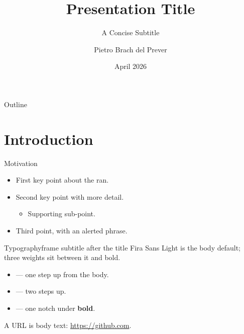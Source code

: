 \documentclass[aspectratio=169, 10pt]{beamer}
\title{Presentation Title}
\subtitle{A Concise Subtitle}
\author[P.\ Brach del Prever]{Pietro Brach del Prever}
\institute[NU / INSI]{Northeastern University \\ Institute for Intelligent Networked Systems}
\date{April 2026}
\begin{document}
{
\begin{frame}[plain]
	\titlepage
\end{frame}
}

\begin{frame}{Outline}
	\tableofcontents
\end{frame}

\section{Introduction}
\sectionframe

\begin{frame}{Motivation}
	\begin{itemize}\tightlist
		\item First key point about the \gls{ran}.
		\item Second key point with more detail.
		      \begin{itemize}
			      \item Supporting sub-point.
		      \end{itemize}
		\item Third point, \alert{with an alerted phrase}.
	\end{itemize}
\end{frame}

\begin{frame}{Typography}{frame subtitle after the title}
	Fira Sans Light is the body default; three weights sit between it and bold.
	\begin{itemize}\tightlist
		\item {} --- one step up from the body.
		\item {} --- two steps up.
		\item {} --- one notch under \textbf{bold}.
	\end{itemize}
	\medskip
	A URL is body text: \url{https://github.com}.
\end{frame}
\end{document}
